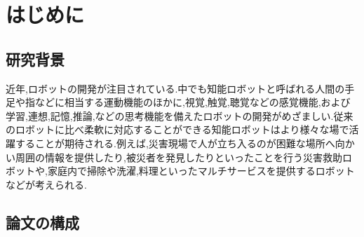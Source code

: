 
\chapter{はじめに}
\label{cha:intro}

\section{研究背景}
近年,ロボットの開発が注目されている.中でも知能ロボットと呼ばれる人間の手足や指などに相当する運動機能のほかに,視覚,触覚,聴覚などの感覚機能,および学習,連想,記憶,推論,などの思考機能を備えたロボットの開発がめざましい.従来のロボットに比べ柔軟に対応することができる知能ロボットはより様々な場で活躍することが期待される.例えば,災害現場で人が立ち入るのが困難な場所へ向かい周囲の情報を提供したり,被災者を発見したりといったことを行う災害救助ロボットや,家庭内で掃除や洗濯,料理といったマルチサービスを提供するロボットなどが考えられる.

\section{論文の構成}







